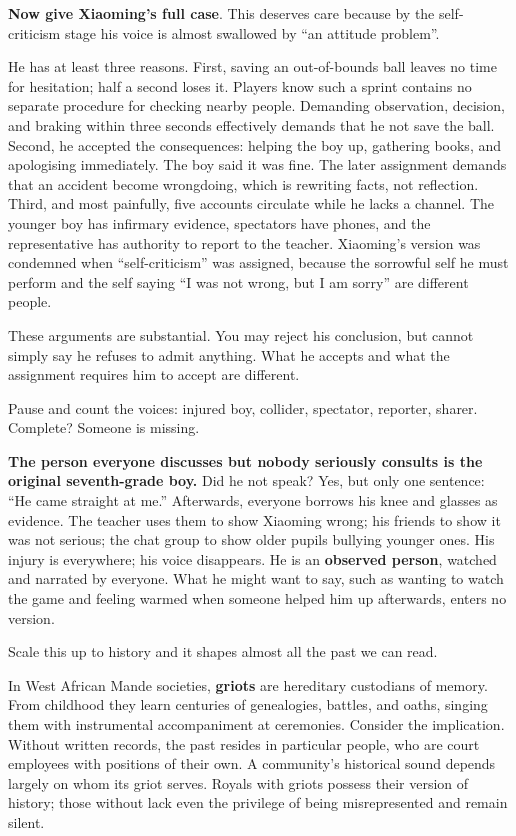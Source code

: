 \textbf{Now give Xiaoming's full case}. This deserves care because by the self-criticism stage his voice is almost swallowed by ``an attitude problem''.

He has at least three reasons. First, saving an out-of-bounds ball leaves no time for hesitation; half a second loses it. Players know such a sprint contains no separate procedure for checking nearby people. Demanding observation, decision, and braking within three seconds effectively demands that he not save the ball. Second, he accepted the consequences: helping the boy up, gathering books, and apologising immediately. The boy said it was fine. The later assignment demands that an accident become wrongdoing, which is rewriting facts, not reflection. Third, and most painfully, five accounts circulate while he lacks a channel. The younger boy has infirmary evidence, spectators have phones, and the representative has authority to report to the teacher. Xiaoming's version was condemned when ``self-criticism'' was assigned, because the sorrowful self he must perform and the self saying ``I was not wrong, but I am sorry'' are different people.

These arguments are substantial. You may reject his conclusion, but cannot simply say he refuses to admit anything. What he accepts and what the assignment requires him to accept are different.

Pause and count the voices: injured boy, collider, spectator, reporter, sharer. Complete? Someone is missing.

\textbf{The person everyone discusses but nobody seriously consults is the original seventh-grade boy.} Did he not speak? Yes, but only one sentence: ``He came straight at me.'' Afterwards, everyone borrows his knee and glasses as evidence. The teacher uses them to show Xiaoming wrong; his friends to show it was not serious; the chat group to show older pupils bullying younger ones. His injury is everywhere; his voice disappears. He is an \textbf{observed person}, watched and narrated by everyone. What he might want to say, such as wanting to watch the game and feeling warmed when someone helped him up afterwards, enters no version.

Scale this up to history and it shapes almost all the past we can read.

In West African Mande societies, \textbf{griots} are hereditary custodians of memory. From childhood they learn centuries of genealogies, battles, and oaths, singing them with instrumental accompaniment at ceremonies. Consider the implication. Without written records, the past resides in particular people, who are court employees with positions of their own. A community's historical sound depends largely on whom its griot serves. Royals with griots possess their version of history; those without lack even the privilege of being misrepresented and remain silent.

